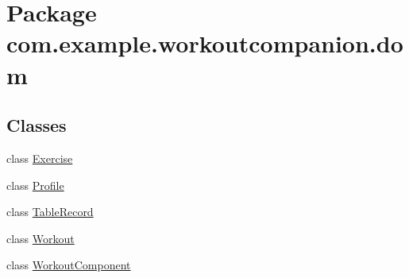 \hypertarget{namespacecom_1_1example_1_1workoutcompanion_1_1dom}{\section{Package com.\-example.\-workoutcompanion.\-dom}
\label{namespacecom_1_1example_1_1workoutcompanion_1_1dom}
}
\subsection*{Classes}
\begin{DoxyCompactItemize}
\item 
class \hyperlink{classcom_1_1example_1_1workoutcompanion_1_1dom_1_1_exercise}{Exercise}
\item 
class \hyperlink{classcom_1_1example_1_1workoutcompanion_1_1dom_1_1_profile}{Profile}
\item 
class \hyperlink{classcom_1_1example_1_1workoutcompanion_1_1dom_1_1_table_record}{Table\-Record}
\item 
class \hyperlink{classcom_1_1example_1_1workoutcompanion_1_1dom_1_1_workout}{Workout}
\item 
class \hyperlink{classcom_1_1example_1_1workoutcompanion_1_1dom_1_1_workout_component}{Workout\-Component}
\end{DoxyCompactItemize}
